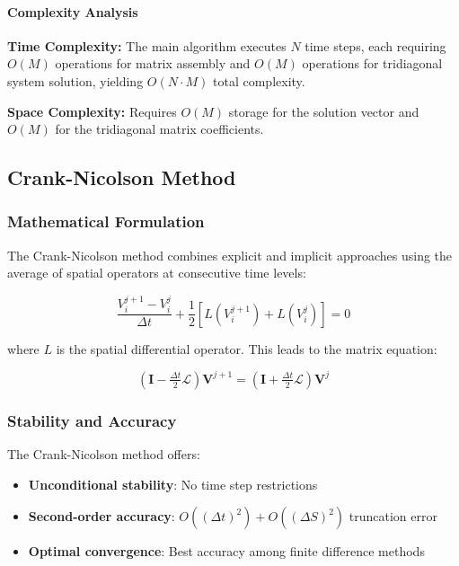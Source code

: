 \documentclass[12pt,a4paper]{article}
\newcommand{\V}{\mathbf{V}}
\newcommand{\Lop}{\mathcal{L}}
\numberwithin{algorithm}{subsection}
\begin{document}
\paragraph{Complexity Analysis}

\textbf{Time Complexity:} The main algorithm executes $N$ time steps, each requiring $O(M)$ operations for matrix assembly and $O(M)$ operations for tridiagonal system solution, yielding $O(N \cdot M)$ total complexity.

\textbf{Space Complexity:} Requires $O(M)$ storage for the solution vector and $O(M)$ for the tridiagonal matrix coefficients.

\subsection{Crank-Nicolson Method}

\subsubsection{Mathematical Formulation}

The Crank-Nicolson method combines explicit and implicit approaches using the average of spatial operators at consecutive time levels:

\begin{equation}
\frac{V_i^{j+1} - V_i^j}{\Delta t} + \frac{1}{2} \left[ L(V_i^{j+1}) + L(V_i^j) \right] = 0
\end{equation}

where $L$ is the spatial differential operator. This leads to the matrix equation:

\begin{equation}
(\mathbf{I} - \tfrac{\Delta t}{2}\Lop) \V^{j+1} = (\mathbf{I} + \tfrac{\Delta t}{2}\Lop) \V^j
\end{equation}

\subsubsection{Stability and Accuracy}

The Crank-Nicolson method offers:
\begin{itemize}
\item \textbf{Unconditional stability}: No time step restrictions
\item \textbf{Second-order accuracy}: $O((\Delta t)^2) + O((\Delta S)^2)$ truncation error
\item \textbf{Optimal convergence}: Best accuracy among finite difference methods
\end{itemize}
\end{document}
